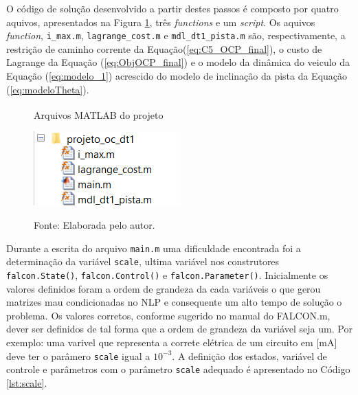 O código de solução desenvolvido a partir destes passos é composto por quatro aquivos, apresentados na Figura \ref{fig:matlab_files}, três \textit{functions} e um \textit{script}. Os aquivos \textit{function}, \lstinline[style=Matlab-editor]{i_max.m},
\lstinline[style=Matlab-editor]{lagrange_cost.m} e \lstinline[style=Matlab-editor]{mdl_dt1_pista.m} são, respectivamente, 
a restrição de caminho corrente da Equação(\ref{eq:C5_OCP_final}), o custo de Lagrange da Equação (\ref{eq:ObjOCP_final}) e o modelo da dinâmica do veiculo da Equação (\ref{eq:modelo_1}) acrescido do modelo de inclinação da pista da Equação (\ref{eq:modeloTheta}).

\begin{figure}[h]
    \centering
    \caption{Arquivos MATLAB\textsuperscript{\textregistered} do projeto}
    \includegraphics[]{Metodologia/Figuras/matlab_files.png}
    \label{fig:matlab_files}
    \caption*{\footnotesize{Fonte: Elaborada pelo autor.}}
\end{figure}


Durante a escrita do arquivo \lstinline[style=Matlab-editor]{main.m} uma dificuldade encontrada foi a determinação da variável \lstinline[style=Matlab-editor]{scale}, 
ultima variável nos construtores \lstinline[style=Matlab-editor]{falcon.State()}, \lstinline[style=Matlab-editor]{falcon.Control()} e \lstinline[style=Matlab-editor]{falcon.Parameter()}.
Inicialmente os valores definidos foram a ordem de grandeza da cada variáveis o que gerou matrizes mau condicionadas no NLP e consequente um alto tempo de solução o problema. 
Os valores corretos, conforme sugerido no manual do FALCON.m\cite{manual:Falcon}, dever ser definidos de tal forma que a ordem de grandeza da variável seja um. Por exemplo: uma varivel que
representa a correte elétrica de um circuito em [mA] deve ter o parâmero \lstinline[style=Matlab-editor]{scale} igual a $10^{-3}$. 
A definição dos estados, variável de controle e parâmetros com o parâmetro \lstinline[style=Matlab-editor]{scale} adequado é apresentado no Código \ref{lst:scale}. 

